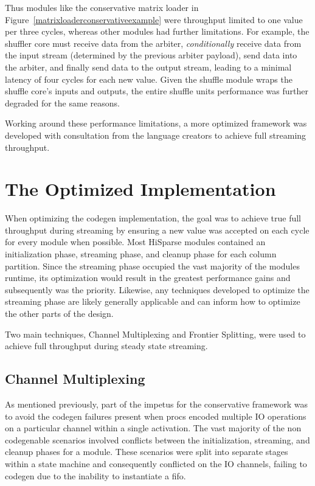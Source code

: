 Thus modules like the conservative matrix loader in Figure~\ref{matrixloaderconservativeexample} were throughput limited to one value per three cycles, whereas other modules had further limitations. For example, the shuffler core must receive data from the arbiter, \textit{conditionally} receive data from the input stream (determined by the previous arbiter payload), send data into the arbiter, and finally send data to the output stream, leading to a minimal latency of four cycles for each new value. Given the shuffle module wraps the shuffle core's inputs and outputs, the entire shuffle units performance was further degraded for the same reasons.

Working around these performance limitations, a more optimized framework was developed with consultation from the language creators to achieve full streaming throughput. %

\section{The Optimized Implementation} %

When optimizing the codegen implementation, the goal was to achieve true full throughput during streaming by ensuring a new value was accepted on each cycle for every module when possible. Most HiSparse modules contained an initialization phase, streaming phase, and cleanup phase for each column partition. Since the streaming phase occupied the vast majority of the modules runtime, its optimization would result in the greatest performance gains and subsequently was the priority. Likewise, any techniques developed to optimize the streaming phase are likely generally applicable and can inform how to optimize the other parts of the design.

Two main techniques, Channel Multiplexing and Frontier Splitting, were used to achieve full throughput during steady state streaming.
\subsection{Channel Multiplexing}
As mentioned previously, part of the impetus for the conservative framework was to avoid the codegen failures present when procs encoded multiple IO operations on a particular channel within a single activation. The vast majority of the non codegenable scenarios involved conflicts between the initialization, streaming, and cleanup phases for a module. These scenarios were split into separate stages within a state machine and consequently conflicted on the IO channels, failing to codegen due to the inability to instantiate a fifo. 

